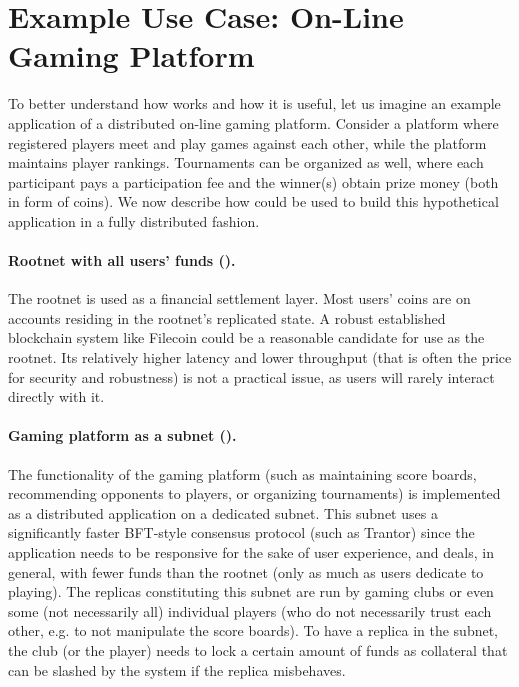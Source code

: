 \section{Example Use Case: On-Line Gaming Platform}
\label{sec:example-use-case}

To better understand how \ipc works and how it is useful, let us imagine an example application of a distributed on-line gaming platform.
Consider a platform where registered players meet and play games against each other, while the platform maintains player rankings.
Tournaments can be organized as well, where each participant pays a participation fee and the winner(s) obtain prize money (both in form of coins).
We now describe how \ipc could be used to build this hypothetical application in a fully distributed fashion.

\paragraph{Rootnet with all users' funds ().}
The rootnet is used as a financial settlement layer.
Most users' coins are on accounts residing in the rootnet's replicated state.
A robust established blockchain system like Filecoin could be a reasonable candidate for use as the rootnet.
Its relatively higher latency and lower throughput (that is often the price for security and robustness) is not a practical issue,
as users will rarely interact directly with it.

\paragraph{Gaming platform as a subnet ().}
The functionality of the gaming platform
(such as maintaining score boards, recommending opponents to players, or organizing tournaments)
is implemented as a distributed application on a dedicated subnet.
This subnet uses a significantly faster BFT-style consensus protocol (such as Trantor)
since the application needs to be responsive for the sake of user experience,
and deals, in general, with fewer funds than the rootnet (only as much as users dedicate to playing).
The replicas constituting this subnet are run by gaming clubs or even some (not necessarily all) individual players
(who do not necessarily trust each other, e.g. to not manipulate the score boards).
To have a replica in the  subnet, the club (or the player) needs to lock a certain amount of funds as collateral that can be slashed by the system if the replica misbehaves.

